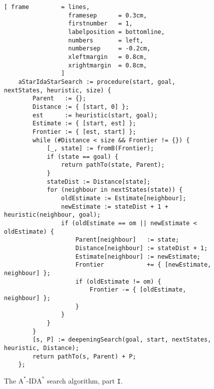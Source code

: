 \begin{figure}[!ht]
\centering
\begin{Verbatim}[ frame         = lines, 
                  framesep      = 0.3cm, 
                  firstnumber   = 1,
                  labelposition = bottomline,
                  numbers       = left,
                  numbersep     = -0.2cm,
                  xleftmargin   = 0.8cm,
                  xrightmargin  = 0.8cm,
                ]
    aStarIdaStarSearch := procedure(start, goal, nextStates, heuristic, size) {
        Parent   := {};
        Distance := { [start, 0] };
        est      := heuristic(start, goal);
        Estimate := { [start, est] };  
        Frontier := { [est, start] };
        while (#Distance < size && Frontier != {}) {
            [_, state] := fromB(Frontier);
            if (state == goal) {
                return pathTo(state, Parent);
            }
            stateDist := Distance[state];
            for (neighbour in nextStates(state)) {
                oldEstimate := Estimate[neighbour];
                newEstimate := stateDist + 1 + heuristic(neighbour, goal);
                if (oldEstimate == om || newEstimate < oldEstimate) {
                    Parent[neighbour]   := state;
                    Distance[neighbour] := stateDist + 1;
                    Estimate[neighbour] := newEstimate;
                    Frontier            += { [newEstimate, neighbour] };
                    if (oldEstimate != om) {
                        Frontier -= { [oldEstimate, neighbour] };
                    }
                }
            }
        }
        [s, P] := deepeningSearch(goal, start, nextStates, heuristic, Distance);
        return pathTo(s, Parent) + P;
    };
\end{Verbatim}
\vspace*{-0.3cm}
\caption{The $\mathrm{A}^*$-$\mathrm{IDA}^*$ search algorithm, part \texttt{I}.}
\label{fig:a-star-ida-star.stlx-1}
\end{figure}

